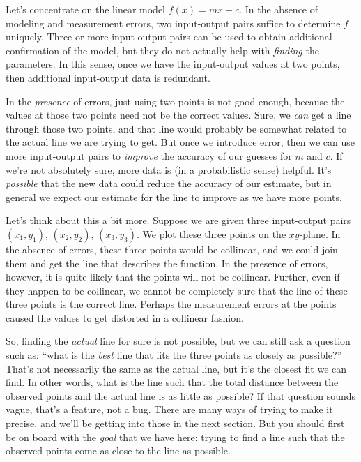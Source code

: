\documentclass[10pt]{amsart}
\begin{document}
Let's concentrate on the linear model $f(x) = mx + c$. In the absence
of modeling and measurement errors, two input-output pairs suffice to
determine $f$ uniquely. Three or more input-output pairs can be used
to obtain additional confirmation of the model, but they do not
actually help with {\em finding} the parameters. In this sense, once
we have the input-output values at two points, then additional
input-output data is redundant.

In the {\em presence} of errors, just using two points is not good
enough, because the values at those two points need not be the correct
values. Sure, we {\em can} get a line through those two points, and
that line would probably be somewhat related to the actual line we are
trying to get. But once we introduce error, then we can use more
input-output pairs to {\em improve} the accuracy of our guesses for
$m$ and $c$. If we're not absolutely sure, more data is (in a
probabilistic sense) helpful. It's {\em possible} that the new data
could reduce the accuracy of our estimate, but in general we expect
our estimate for the line to improve as we have more points.

Let's think about this a bit more. Suppose we are given three
input-output pairs $(x_1,y_1)$, $(x_2,y_2)$, $(x_3,y_3)$. We plot
these three points on the $xy$-plane. In the absence of errors, these
three points would be collinear, and we could join them and get the
line that describes the function. In the presence of errors, however,
it is quite likely that the points will not be collinear. Further,
even if they happen to be collinear, we cannot be completely sure that
the line of these three points is the correct line. Perhaps the
measurement errors at the points caused the values to get distorted in
a collinear fashion.

So, finding the {\em actual} line for sure is not possible, but we can
still ask a question such as: ``what is the {\em best} line that fits
the three points as closely as possible?'' That's not necessarily the
same as the actual line, but it's the closest fit we can find. In
other words, what is the line such that the total distance between the
observed points and the actual line is as little as possible? If that
question sounds vague, that's a feature, not a bug. There are many
ways of trying to make it precise, and we'll be getting into those in
the next section. But you should first be on board with the {\em goal}
that we have here: trying to find a line such that the observed points
come as close to the line as possible.
\end{document}
